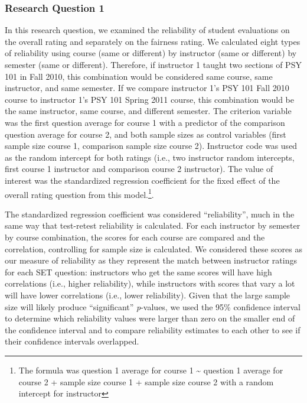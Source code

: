 \documentclass[
  man,mask]{apa7}
\begin{document}
\subsubsection{Research Question 1}\label{research-question-1}

In this research question, we examined the reliability of student
evaluations on the overall rating and separately on the fairness rating.
We calculated eight types of reliability using course (same or
different) by instructor (same or different) by semester (same or
different). Therefore, if instructor 1 taught two sections of PSY 101 in
Fall 2010, this combination would be considered same course, same
instructor, and same semester. If we compare instructor 1's PSY 101 Fall
2010 course to instructor 1's PSY 101 Spring 2011 course, this
combination would be the same instructor, same course, and different
semester. The criterion variable was the first question
average for course 1 with a predictor of the comparison question average
for course 2, and both sample sizes as control variables (first sample
size course 1, comparison sample size course 2). Instructor code was
used as the random intercept for both ratings (i.e., two instructor
random intercepts, first course 1 instructor and comparison course 2
instructor). The value of interest was the standardized regression coefficient for the fixed effect of the overall rating question from this model.\footnote{The
  formula was question 1 average for course 1 \textasciitilde{} question 1 average for
  course 2 + sample size course 1 + sample size course 2 with a random
  intercept for instructor}.

The standardized regression coefficient was considered ``reliability'',
much in the same way that test-retest reliability is calculated. For
each instructor by semester by course combination, the scores for each
course are compared and the correlation, controlling for sample size is
calculated. We considered these scores as our measure of reliability as
they represent the match between instructor ratings for each SET
question: instructors who get the same scores will have high correlations (i.e., higher reliability), while instructors with scores that vary a lot will have lower correlations (i.e., lower reliability). Given that the large sample size will likely produce
``significant'' \emph{p}-values, we used the 95\% confidence interval to
determine which reliability values were larger than zero on the smaller
end of the confidence interval and to compare reliability estimates to
each other to see if their confidence intervals overlapped.
\end{document}
